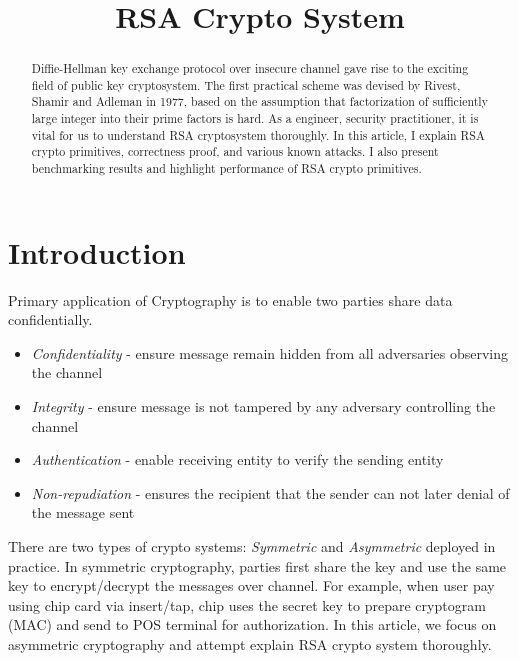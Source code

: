 \documentclass{article}
\title{ RSA Crypto System}
\author{}
\begin{document}
	\maketitle
	\begin{abstract}
	   Diffie-Hellman key exchange protocol over insecure channel gave rise to the exciting field of public key cryptosystem. The first practical scheme was devised by Rivest, Shamir and Adleman in 1977, based on the assumption that factorization of sufficiently large integer into their prime factors is hard. As a engineer, security practitioner, it is vital for us to understand RSA cryptosystem thoroughly. In this article, I explain RSA crypto primitives, correctness proof, and various known attacks. I also present benchmarking results and highlight performance of RSA crypto primitives.
	
	\end{abstract}
	
	\section{Introduction }
	Primary application of Cryptography is to enable two parties share data confidentially.
	  \begin{itemize}
	  	\item \textit{Confidentiality} - ensure message remain hidden from all adversaries observing the channel
	  	\item \textit{Integrity} - ensure message is not tampered by any adversary controlling the channel
	  	\item \textit{Authentication} - enable receiving entity to verify the sending entity
	  	\item \textit{Non-repudiation} - ensures the recipient that the sender can not later denial of the message sent
	  	
	  \end{itemize}
	
	There are two types of crypto systems: \textit{Symmetric} and \textit{Asymmetric} deployed in practice. In symmetric cryptography, parties first share the key and use the same key to encrypt/decrypt the messages over channel. For example, when user pay using chip card via insert/tap, chip uses the secret key to prepare cryptogram (MAC) and send to POS terminal for authorization. In this article, we focus on asymmetric cryptography and attempt explain RSA crypto system thoroughly.
	
\end{document}
